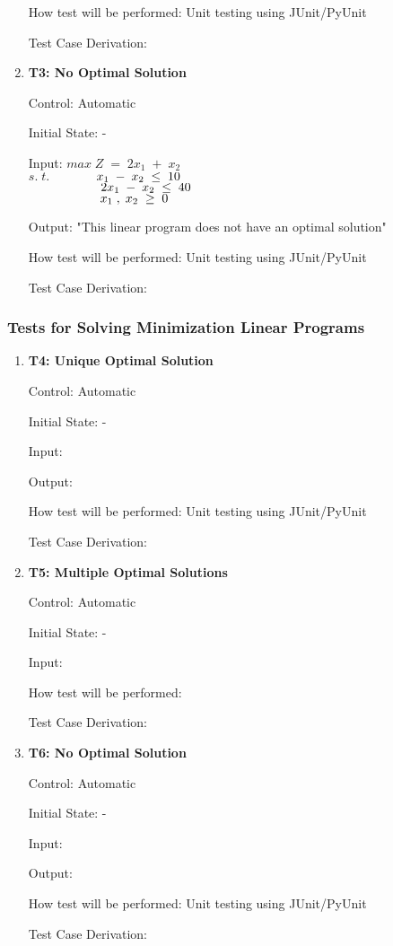 \documentclass[12pt, titlepage]{article}
\begin{document}
\begin{enumerate}
	How test will be performed: Unit testing using JUnit/PyUnit
	
	Test Case Derivation: 

	\item{\textbf{T3: No Optimal Solution}}
	
	Control: Automatic 
	
	Initial State: -
	
	Input: $max\;Z\;=\;2x_1\;+\;x_2$\\
	$s.\;t.$$\hspace*{1.3cm} x_1\;-\;x_2\; \leq \;10$\\
	$\hspace*{2cm} 2x_1\;-\;x_2\; \leq \;40$\\
	$\hspace*{2cm} x_1\;,\;x_2\; \geq \;0$
	
	Output: "This linear program does not have an optimal solution"
	
	How test will be performed: Unit testing using JUnit/PyUnit
	
	Test Case Derivation: 
\end{enumerate}

\subsubsection{Tests for Solving Minimization Linear Programs}

\begin{enumerate}
	\item{\textbf{T4: Unique Optimal Solution}}
	
	Control: Automatic 
	
	Initial State: -
	
	Input:
	
	Output: 
	
	How test will be performed: Unit testing using JUnit/PyUnit
	
	Test Case Derivation: 
	
	\item{\textbf{T5: Multiple Optimal Solutions}}
	
	Control: Automatic 
	
	Initial State: -
	
	Input: 
	
	How test will be performed: 
	
	Test Case Derivation: 
	
	\item{\textbf{T6: No Optimal Solution}}
	
	Control: Automatic 
	
	Initial State: -
	
	Input:
	
	Output: 
	
	How test will be performed: Unit testing using JUnit/PyUnit
	
	Test Case Derivation: 
\end{enumerate}
\end{document}
